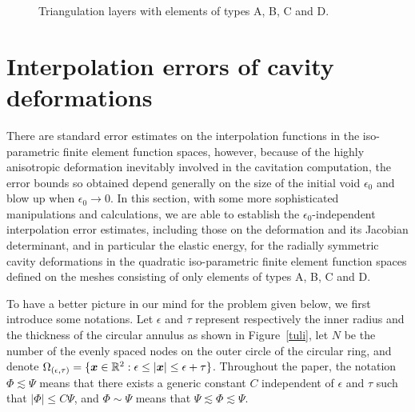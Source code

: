 \documentclass[12pt]{article}
\renewcommand{\vec}[1]{\mbox{\boldmath$#1$}}
\numberwithin{equation}{section}
\begin{document}
\begin{figure}[h!]
     \begin{minipage}[c]{0.5\textwidth}\hspace{-35mm}
     \end{minipage}
     \begin{minipage}[c]{0.5\textwidth}\hspace{-35mm}
     \end{minipage}
     \vspace*{-4mm}
 \caption{Triangulation layers with elements of types A, B, C and D.} \label{tuli0}
\end{figure}


\section{Interpolation errors of cavity deformations}
There are standard error estimates \cite{Ciarlet} on the interpolation functions in the
iso-parametric finite element function spaces, however, because of the highly anisotropic
deformation inevitably involved in the cavitation computation, the error bounds so obtained
depend generally on the size of the initial void $\epsilon_0$ and blow up when
$\epsilon_0\rightarrow 0$. In this section, with some more sophisticated manipulations
and calculations, we are able to establish the $\epsilon_0$-independent interpolation
error estimates, including those on the deformation and its
Jacobian determinant, and in particular the elastic energy, for the radially symmetric
cavity deformations in the quadratic iso-parametric finite element function spaces
defined on the meshes consisting of only elements of types A, B, C and D.

To have a better picture in our mind for the problem given below, we first introduce
some notations. Let $\epsilon$ and $\tau$ represent respectively the inner radius
and the thickness of the circular annulus as shown in Figure~\ref{tuli},
let $N$ be the number of the evenly spaced nodes on the outer circle of the circular
ring, and denote
$\Omega_{(\epsilon,\tau)}=\{\vec{x} \in \mathbb{R}^2: \epsilon \le |\vec{x}| \le
\epsilon+\tau\}$. Throughout the paper, the notation
$\Phi \lesssim \Psi$ means that there exists a generic constant $C$ independent of
$\epsilon$ and $\tau$ such that $|\Phi| \le C \Psi$, and $\Phi\sim \Psi$ means that
$\Psi \lesssim \Phi \lesssim \Psi$.
\end{document}
